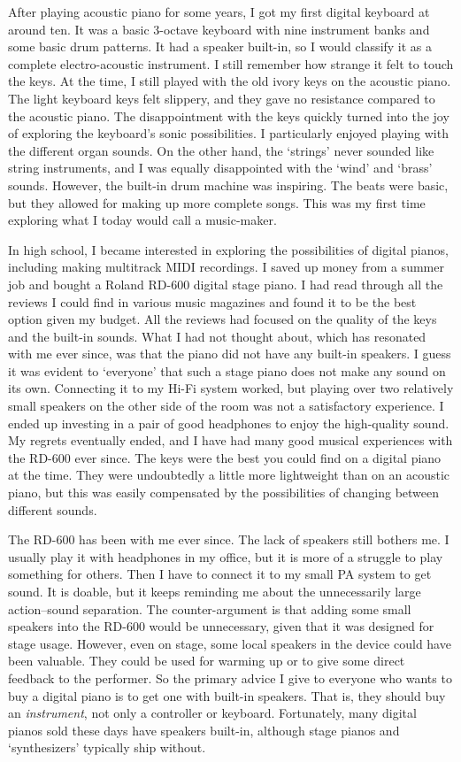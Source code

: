 After playing acoustic piano for some years, I got my first digital keyboard at around ten. It was a basic 3-octave keyboard with nine instrument banks and some basic drum patterns. It had a speaker built-in, so I would classify it as a complete electro-acoustic instrument. I still remember how strange it felt to touch the keys. At the time, I still played with the old ivory keys on the acoustic piano. The light keyboard keys felt slippery, and they gave no resistance compared to the acoustic piano. The disappointment with the keys quickly turned into the joy of exploring the keyboard's sonic possibilities. I particularly enjoyed playing with the different organ sounds. On the other hand, the `strings' never sounded like string instruments, and I was equally disappointed with the `wind' and `brass' sounds. However, the built-in drum machine was inspiring. The beats were basic, but they allowed for making up more complete songs. This was my first time exploring what I today would call a music-maker.

In high school, I became interested in exploring the possibilities of digital pianos, including making multitrack MIDI recordings. I saved up money from a summer job and bought a Roland RD-600 digital stage piano. I had read through all the reviews I could find in various music magazines and found it to be the best option given my budget. All the reviews had focused on the quality of the keys and the built-in sounds. What I had not thought about, which has resonated with me ever since, was that the piano did not have any built-in speakers. I guess it was evident to `everyone' that such a stage piano does not make any sound on its own. Connecting it to my Hi-Fi system worked, but playing over two relatively small speakers on the other side of the room was not a satisfactory experience. I ended up investing in a pair of good headphones to enjoy the high-quality sound. My regrets eventually ended, and I have had many good musical experiences with the RD-600 ever since. The keys were the best you could find on a digital piano at the time. They were undoubtedly a little more lightweight than on an acoustic piano, but this was easily compensated by the possibilities of changing between different sounds.

The RD-600 has been with me ever since. The lack of speakers still bothers me. I usually play it with headphones in my office, but it is more of a struggle to play something for others. Then I have to connect it to my small PA system to get sound. It is doable, but it keeps reminding me about the unnecessarily large action--sound separation. The counter-argument is that adding some small speakers into the RD-600 would be unnecessary, given that it was designed for stage usage. However, even on stage, some local speakers in the device could have been valuable. They could be used for warming up or to give some direct feedback to the performer. So the primary advice I give to everyone who wants to buy a digital piano is to get one with built-in speakers. That is, they should buy an \emph{instrument}, not only a controller or keyboard. Fortunately, many digital pianos sold these days have speakers built-in, although stage pianos and `synthesizers' typically ship without.


